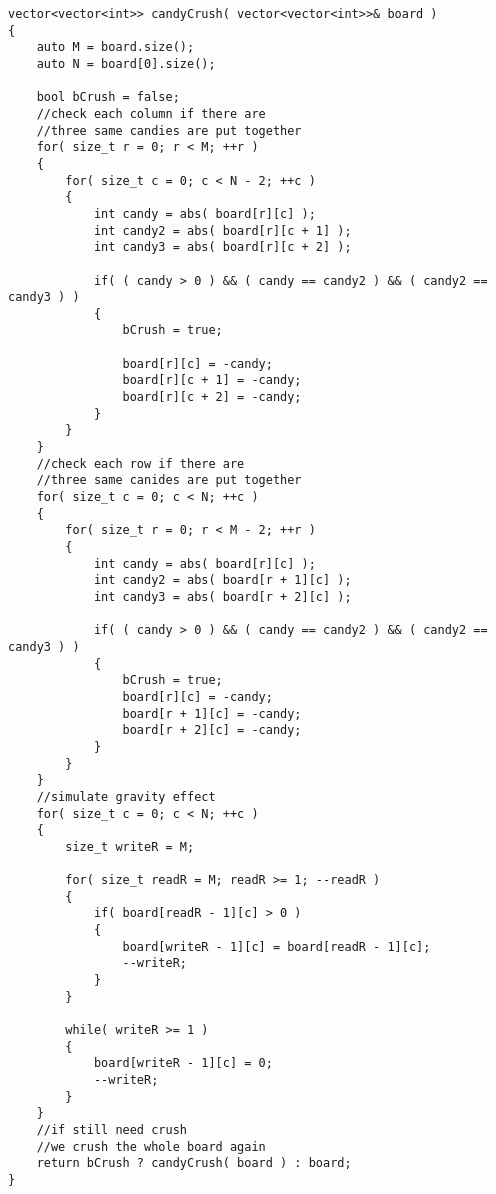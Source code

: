\setcounter{lstlisting}{0}
\begin{lstlisting}[style=customc, caption={Simulation}]
vector<vector<int>> candyCrush( vector<vector<int>>& board )
{
    auto M = board.size();
    auto N = board[0].size();

    bool bCrush = false;
    //check each column if there are
    //three same candies are put together
    for( size_t r = 0; r < M; ++r )
    {
        for( size_t c = 0; c < N - 2; ++c )
        {
            int candy = abs( board[r][c] );
            int candy2 = abs( board[r][c + 1] );
            int candy3 = abs( board[r][c + 2] );

            if( ( candy > 0 ) && ( candy == candy2 ) && ( candy2 == candy3 ) )
            {
                bCrush = true;

                board[r][c] = -candy;
                board[r][c + 1] = -candy;
                board[r][c + 2] = -candy;
            }
        }
    }
    //check each row if there are
    //three same canides are put together
    for( size_t c = 0; c < N; ++c )
    {
        for( size_t r = 0; r < M - 2; ++r )
        {
            int candy = abs( board[r][c] );
            int candy2 = abs( board[r + 1][c] );
            int candy3 = abs( board[r + 2][c] );

            if( ( candy > 0 ) && ( candy == candy2 ) && ( candy2 == candy3 ) )
            {
                bCrush = true;
                board[r][c] = -candy;
                board[r + 1][c] = -candy;
                board[r + 2][c] = -candy;
            }
        }
    }
    //simulate gravity effect
    for( size_t c = 0; c < N; ++c )
    {
        size_t writeR = M;

        for( size_t readR = M; readR >= 1; --readR )
        {
            if( board[readR - 1][c] > 0 )
            {
                board[writeR - 1][c] = board[readR - 1][c];
                --writeR;
            }
        }

        while( writeR >= 1 )
        {
            board[writeR - 1][c] = 0;
            --writeR;
        }
    }
    //if still need crush
    //we crush the whole board again
    return bCrush ? candyCrush( board ) : board;
}
\end{lstlisting}


